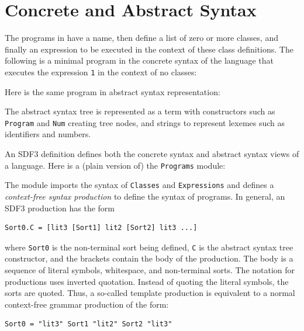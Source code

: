 \section{Concrete and Abstract Syntax}

The programs in  have a name, then define a list of
zero or more classes, and finally an expression to be executed in the context of
these class definitions. The following is a minimal program in the concrete
syntax of the language that executes the expression \texttt{1} in the context of
no classes:



Here is the same program in abstract syntax representation:



The abstract syntax tree is represented as a term with constructors such as
\texttt{Program} and \texttt{Num} creating tree nodes, and strings to represent
lexemes such as identifiers and numbers.

An SDF3 definition defines both the concrete syntax and abstract syntax views of
a language. Here is a (plain version of) the \texttt{Programs} module:



The module imports the syntax of \texttt{Classes} and \texttt{Expressions} and
defines a \emph{context-free syntax production} to define the syntax of
programs. In general, an SDF3 production has the form

\begin{lstlisting}[language=SDF]
  Sort0.C = [lit3 [Sort1] lit2 [Sort2] lit3 ...]
\end{lstlisting}

where \texttt{Sort0} is the non-terminal sort being defined, \texttt{C} is the
abstract syntax tree constructor, and the brackets contain the body of the
production. The body is a sequence of literal symbols, whitespace, and
non-terminal sorts. The notation for productions uses inverted quotation.
Instead of quoting the literal symbols, the sorts are quoted. Thus, a so-called
template production is equivalent to a normal context-free grammar production of
the form:

\begin{lstlisting}[language=SDF]
  Sort0 = "lit3" Sort1 "lit2" Sort2 "lit3"
\end{lstlisting}

